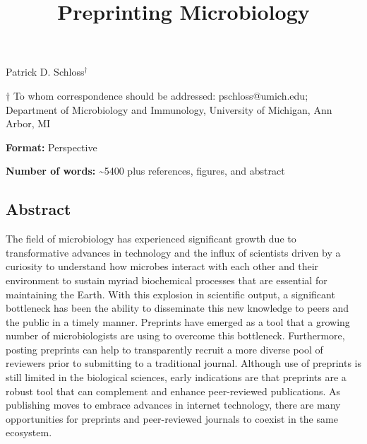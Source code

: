 \documentclass[11pt,]{article}
\title{\textbf{Preprinting Microbiology}}
\author{}
\date{}
\begin{document}
\maketitle

\begin{center}
\vspace{25mm}
Patrick D. Schloss${^\dagger}$

\vspace{30mm}

$\dagger$ To whom correspondence should be addressed: pschloss@umich.edu; Department of Microbiology and Immunology, University of Michigan, Ann Arbor, MI

\vspace{10mm}

\textbf{Format:} Perspective

\textbf{Number of words:} \textasciitilde5400 plus references, figures, and abstract

\end{center}

\newpage

\linenumbers

\subsection{Abstract}\label{abstract}

The field of microbiology has experienced significant growth due to
transformative advances in technology and the influx of scientists
driven by a curiosity to understand how microbes interact with each
other and their environment to sustain myriad biochemical processes that
are essential for maintaining the Earth. With this explosion in
scientific output, a significant bottleneck has been the ability to
disseminate this new knowledge to peers and the public in a timely
manner. Preprints have emerged as a tool that a growing number of
microbiologists are using to overcome this bottleneck. Furthermore,
posting preprints can help to transparently recruit a more diverse pool
of reviewers prior to submitting to a traditional journal. Although use
of preprints is still limited in the biological sciences, early
indications are that preprints are a robust tool that can complement and
enhance peer-reviewed publications. As publishing moves to embrace
advances in internet technology, there are many opportunities for
preprints and peer-reviewed journals to coexist in the same ecosystem.

\newpage
\end{document}
